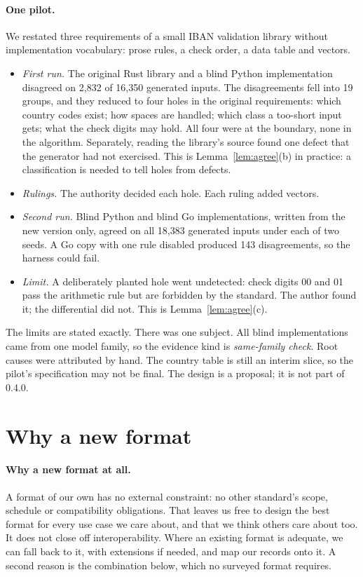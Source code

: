 \documentclass[11pt]{article}
\theoremstyle{definition}
\theoremstyle{remark}
\begin{document}
\paragraph{One pilot.} We restated three requirements of a small IBAN validation library without
implementation vocabulary: prose rules, a check order, a data table and vectors.
\begin{itemize}[itemsep=1pt]
\item \emph{First run.} The original Rust library and a blind Python implementation disagreed on
  2{,}832 of 16{,}350 generated inputs. The disagreements fell into 19 groups, and they reduced to
  four holes in the original requirements: which country codes exist; how spaces are handled;
  which class a too-short input gets; what the check digits may hold. All four were at the
  boundary, none in the algorithm. Separately, reading the library's source found one defect that
  the generator had not exercised. This is Lemma~\ref{lem:agree}(b) in practice: a classification
  is needed to tell holes from defects.
\item \emph{Rulings.} The authority decided each hole. Each ruling added vectors.
\item \emph{Second run.} Blind Python and blind Go implementations, written from the new version
  only, agreed on all 18{,}383 generated inputs under each of two seeds. A Go copy with one rule disabled
  produced 143 disagreements, so the harness could fail.
\item \emph{Limit.} A deliberately planted hole went undetected: check digits 00 and 01 pass the
  arithmetic rule but are forbidden by the standard. The author found it; the differential did
  not. This is Lemma~\ref{lem:agree}(c).
\end{itemize}
The limits are stated exactly. There was one subject. All blind implementations came from one model
family, so the evidence kind is \emph{same-family check}. Root causes were attributed by hand. The
country table is still an interim slice, so the pilot's specification may not be final. The design
is a proposal; it is not part of 0.4.0.

\section{Why a new format}\label{sec:related}

\paragraph{Why a new format at all.}
A format of our own has no external constraint: no other standard's scope, schedule or compatibility
obligations. That leaves us free to design the best format for every use case we care about, and that
we think others care about too. It does not close off interoperability. Where an existing format is
adequate, we can fall back to it, with extensions if needed, and map our records onto it. A second
reason is the combination below, which no surveyed format requires.
\end{document}
